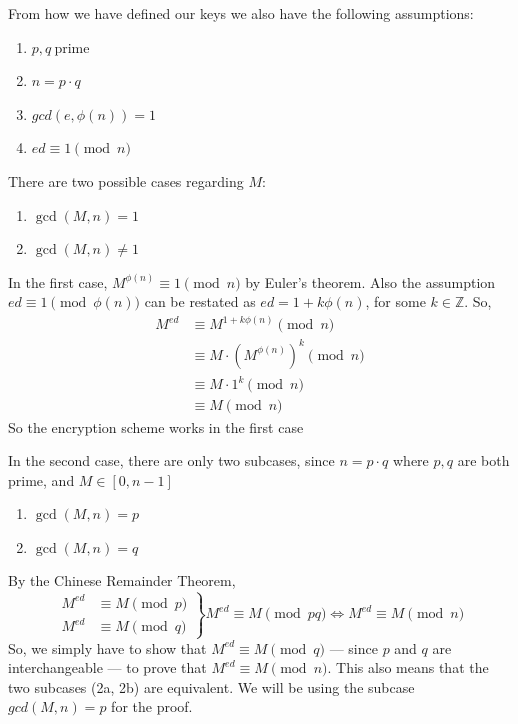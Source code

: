\documentclass[12pt, titlepage]{article}
\begin{document}
        From how we have defined our keys we also have the following assumptions:
        \begin{enumerate}
            \item $p,q\ \text{prime}$
            \item $n = p \cdot q$
            \item $gcd(e, \phi(n)) = 1$ 
            \item $ed \equiv 1 \pmod{n}$
        \end{enumerate}

        There are two possible cases regarding $M$:
        \begin{enumerate}
            \item $\gcd(M, n) = 1$
            \item $\gcd(M, n) \not= 1$
        \end{enumerate}

        In the first case, $M^{\phi(n)} \equiv 1 \pmod{n}$ by Euler's theorem. Also the
        assumption $ed \equiv 1 \pmod{\phi(n)}$ can be restated as $ed = 1 + k\phi(n)$, for
        some $k \in \mathbb{Z}$. So, 
        \begin{align*}
            M^{ed} &\equiv M^{1 + k\phi(n)} \pmod{n} \\
                   &\equiv M \cdot (M^{\phi(n)})^k  \pmod{n} \\
                   &\equiv M \cdot 1^k \pmod{n} \\
                   &\equiv M \pmod{n}
        \end{align*}
        So the encryption scheme works in the first case

        In the second case, there are only two subcases, since $n = p \cdot q$ where $p, q$
        are both prime, and $ M \in \left[0, n-1\right]$
        \renewcommand{\labelenumi}{2\alph{enumi}.}
        \begin{enumerate}
            \item $\gcd(M, n) = p$
            \item $\gcd(M, n) = q$
        \end{enumerate}
        
        By the Chinese Remainder Theorem,
        \begin{equation*}
            \left.
                \begin{aligned}
                    M^{ed} &\equiv M \pmod{p}\\
                    M^{ed} &\equiv M \pmod{q}
                \end{aligned}
            \right\}
            M^{ed} \equiv M \pmod{pq} \iff M^{ed} \equiv M \pmod{n}
        \end{equation*}
        So, we simply have to show that $M^{ed} \equiv M \pmod{q}$ --- since $p$ and $q$ are
        interchangeable --- to prove that $M^{ed} \equiv M \pmod{n}$. This also means that
        the two subcases (2a, 2b) are equivalent. We will be using the subcase $gcd(M, n) =
        p$ for the proof.
        
\end{document}
